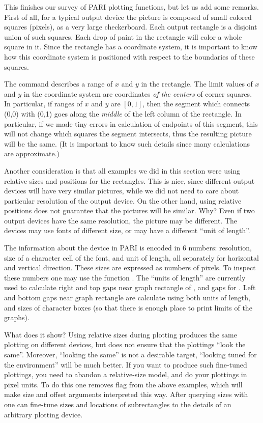 This finishes our survey of PARI plotting functions, but let us add
some remarks.  First of all, for a typical output device the picture is
composed of small colored squares (pixels), as a very large checkerboard.
Each output rectangle is a disjoint union of such squares.  Each drop
of paint in the rectangle will color a whole square in it.  Since the
rectangle has a coordinate system, it is important to know how this
coordinate system is positioned with respect to the boundaries of these
squares.

The command  describes a range of $x$ and $y$ in the
rectangle.  The limit values of $x$ and $y$ in the coordinate system are
coordinates \emph{of the centers} of corner squares.  In particular,
if ranges of $x$ and $y$ are $[0,1]$, then the segment which connects (0,0)
with (0,1) goes along the \emph{middle} of the left column of the rectangle.
In particular, if we made tiny errors in calculation of endpoints of this
segment, this will not change which squares the segment intersects, thus
the resulting picture will be the same.  (It is important to know such details
since many calculations are approximate.)

Another consideration is that all examples we did in this section were
using relative sizes and positions for the rectangles.  This is nice, since
different output devices will have very similar pictures, while we
did not need to care about particular resolution of the output device.
On the other hand,
using relative positions does not guarantee that the pictures will be
similar.  Why?  Even if two output devices have the same resolution,
the picture may be different.  The devices may use fonts of different
size, or may have a different ``unit of length''.

The information about the device in PARI is encoded in 6 numbers: resolution,
size of a character cell of the font, and unit of length, all separately
for horizontal and vertical direction.  These sizes are expressed as
numbers of pixels.  To inspect these numbers one may use the function
.  The ``units of length'' are currently used to calculate
right and top gaps near graph rectangle of , and gaps for
.  Left and bottom gaps near graph rectangle are calculate
using both units of length, and sizes of character boxes (so that there
is enough place to print limits of the graphs).

What does it show?  Using relative sizes during plotting produces
 the same plotting on different devices, but does not
ensure that the plottings ``look the same''.  Moreover, ``looking the
same'' is not a desirable target, ``looking tuned for the environment''
will be much better.  If you want to produce such fine-tuned plottings,
you need to abandon a relative-size model, and do your plottings in
pixel units.  To do this one removes flag  from the above
examples, which will make size and offset arguments interpreted this way.
After querying sizes with  one can fine-tune sizes and
locations of subrectangles to the details of an arbitrary plotting
device.

